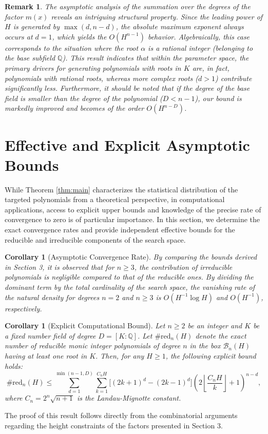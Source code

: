 \documentclass[11pt,a4paper]{article}
\newtheorem{corollary}[theorem]{Corollary}
\newtheorem{remark}[theorem]{Remark}
\newcommand{\Q}{\mathbb{Q}}
\begin{document}
\begin{remark}
The asymptotic analysis of the summation over the degrees of the factor $m(x)$ reveals an intriguing structural property. Since the leading power of $H$ is generated by $\max(d, n-d)$, the absolute maximum exponent always occurs at $d=1$, which yields the $O(H^{n-1})$ behavior. Algebraically, this case corresponds to the situation where the root $\alpha$ is a rational integer (belonging to the base subfield $\Q$). This result indicates that within the parameter space, the primary drivers for generating polynomials with roots in $K$ are, in fact, polynomials with rational roots, whereas more complex roots ($d > 1$) contribute significantly less. Furthermore, it should be noted that if the degree of the base field is smaller than the degree of the polynomial ($D < n-1$), our bound is markedly improved and becomes of the order $O(H^{n-D})$.
\end{remark}\section{Effective and Explicit Asymptotic Bounds}
While Theorem \ref{thm:main} characterizes the statistical distribution of the targeted polynomials from a theoretical perspective, in computational applications, access to explicit upper bounds and knowledge of the precise rate of convergence to zero is of particular importance. In this section, we determine the exact convergence rates and provide independent effective bounds for the reducible and irreducible components of the search space.

\begin{corollary}[Asymptotic Convergence Rate]
By comparing the bounds derived in Section 3, it is observed that for $n \ge 3$, the contribution of irreducible polynomials is negligible compared to that of the reducible ones. By dividing the dominant term by the total cardinality of the search space, the vanishing rate of the natural density for degrees $n = 2$ and $n \ge 3$ is $O(H^{-1}\log H)$ and $O(H^{-1})$, respectively.
\end{corollary}

\begin{corollary}[Explicit Computational Bound]
Let $n \ge 2$ be an integer and $K$ be a fixed number field of degree $D = [K:\Q]$. Let $\#\mathrm{red}_n(H)$ denote the exact number of reducible monic integer polynomials of degree $n$ in the box $\mathcal{B}_n(H)$ having at least one root in $K$. Then, for any $H \ge 1$, the following explicit bound holds:
\begin{equation*}
    \#\mathrm{red}_n(H) \le \sum_{d=1}^{\min(n-1, D)} \sum_{k=1}^{C_n H} \Big[ (2k+1)^d - (2k-1)^d \Big] \left( 2 \left\lfloor \frac{C_n H}{k} \right\rfloor + 1 \right)^{n-d},
\end{equation*}
where $C_n = 2^n \sqrt{n+1}$ is the Landau-Mignotte constant.
\end{corollary}
The proof of this result follows directly from the combinatorial arguments regarding the height constraints of the factors presented in Section 3.
\end{document}
